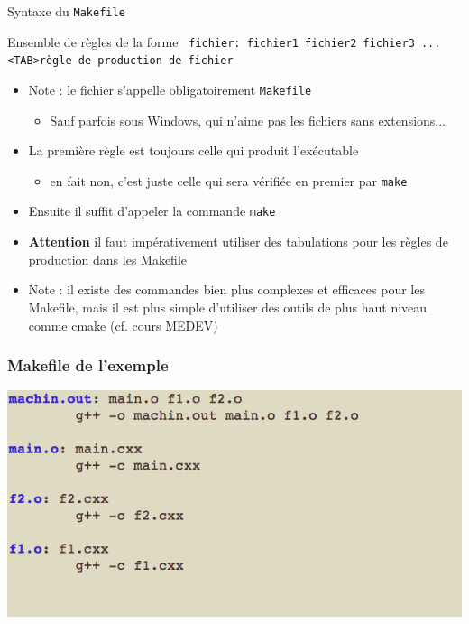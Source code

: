 \begin{frame}{Syntaxe du \texttt{Makefile}}
\begin{block}{Ensemble de règles de la forme}
\texttt{  fichier: fichier1 fichier2 fichier3 ... \\
  	<TAB>règle de production de fichier \\
}\end{block}
\begin{itemize}
\item Note : le fichier s'appelle obligatoirement \texttt{Makefile}
\begin{itemize}
\item Sauf parfois sous Windows, qui n'aime pas les fichiers sans extensions...
\end{itemize}
\item La première règle est toujours celle qui produit l'exécutable
\begin{itemize}
	\item en fait non, c'est juste celle qui sera vérifiée en premier par \texttt{make}
\end{itemize}
\item Ensuite il suffit d'appeler la commande \texttt{make}
\item \textbf{Attention} il faut impérativement utiliser des tabulations pour les règles de production dans les Makefile
\item Note : il existe des commandes bien plus complexes et efficaces pour les Makefile, mais il est plus simple d'utiliser des outils de plus haut niveau comme cmake (cf. cours MEDEV)
\end{itemize}
\end{frame}

\begin{frame}[fragile]
  \frametitle{Makefile de l'exemple}
        \begin{center}
      \includegraphics[scale=.4]{fig/makefile.png}
    \end{center}
\end{frame}
